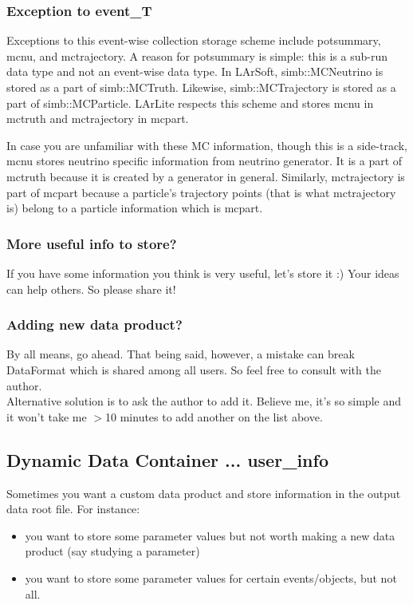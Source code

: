 \subsubsection{Exception to {\ttfamily event\_T}}
Exceptions to this event-wise collection storage scheme include {\ttfamily potsummary}, {\ttfamily mcnu}, and {\ttfamily mctrajectory}.
A reason for {\ttfamily potsummary} is simple: this is a sub-run data type and not an event-wise data type.
In LArSoft, {\ttfamily simb::MCNeutrino} is stored as a part of {\ttfamily simb::MCTruth}. Likewise, {\ttfamily simb::MCTrajectory} is stored as a part of {\ttfamily simb::MCParticle}. LArLite respects this scheme and stores {\ttfamily mcnu} in {\ttfamily mctruth} and {\ttfamily mctrajectory} in {\ttfamily mcpart}.

In case you are unfamiliar with these MC information, though this is a side-track, {\ttfamily mcnu} stores neutrino specific information from neutrino generator. It is a part of {\ttfamily mctruth} because it is created by a generator in general. Similarly, {\ttfamily mctrajectory} is part of {\ttfamily mcpart} because a particle's trajectory points (that is what {\ttfamily mctrajectory} is) belong to a particle information which is {\ttfamily mcpart}.

\subsubsection{More useful info to store?}
If you have some information you think is very useful, let's store it :)
Your ideas can help others. So please share it!

\subsubsection{Adding new data product?}
By all means, go ahead. 
That being said, however, a mistake can break DataFormat which is shared among all users.
So feel free to consult with the author.\\

Alternative solution is to ask the author to add it. 
Believe me, it's so simple and it won't take me $>$10 minutes to add another on the list above.

\subsection{Dynamic Data Container ... {\ttfamily user\_info}}

Sometimes you want a custom data product and store information in the output data root file.
For instance:
\begin{itemize}
\item you want to store some parameter values but not worth making a new data product (say studying a parameter)
\item you want to store some parameter values for certain events/objects, but not all.
\end{itemize}

